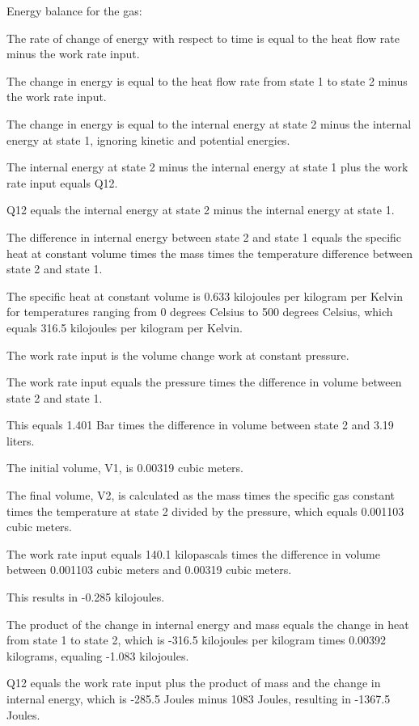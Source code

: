 Energy balance for the gas:

The rate of change of energy with respect to time is equal to the heat flow rate minus the work rate input.

The change in energy is equal to the heat flow rate from state 1 to state 2 minus the work rate input.

The change in energy is equal to the internal energy at state 2 minus the internal energy at state 1, ignoring kinetic and potential energies.

The internal energy at state 2 minus the internal energy at state 1 plus the work rate input equals Q12.

Q12 equals the internal energy at state 2 minus the internal energy at state 1.

The difference in internal energy between state 2 and state 1 equals the specific heat at constant volume times the mass times the temperature difference between state 2 and state 1.

The specific heat at constant volume is 0.633 kilojoules per kilogram per Kelvin for temperatures ranging from 0 degrees Celsius to 500 degrees Celsius, which equals 316.5 kilojoules per kilogram per Kelvin.

The work rate input is the volume change work at constant pressure.

The work rate input equals the pressure times the difference in volume between state 2 and state 1.

This equals 1.401 Bar times the difference in volume between state 2 and 3.19 liters.

The initial volume, V1, is 0.00319 cubic meters.

The final volume, V2, is calculated as the mass times the specific gas constant times the temperature at state 2 divided by the pressure, which equals 0.001103 cubic meters.

The work rate input equals 140.1 kilopascals times the difference in volume between 0.001103 cubic meters and 0.00319 cubic meters.

This results in -0.285 kilojoules.

The product of the change in internal energy and mass equals the change in heat from state 1 to state 2, which is -316.5 kilojoules per kilogram times 0.00392 kilograms, equaling -1.083 kilojoules.

Q12 equals the work rate input plus the product of mass and the change in internal energy, which is -285.5 Joules minus 1083 Joules, resulting in -1367.5 Joules.